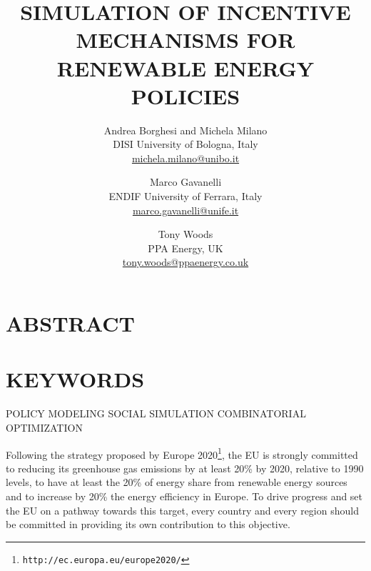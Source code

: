\documentclass [twocolumn,a4paper,10pt]{ECMS}
\newcommand{\Section}[1]{\section*{#1}\vspace*{-0.7em}}
\newcommand{\Subsection}[1]{\subsection*{#1}\vspace*{-0.7em}}
\begin{document}

\title{SIMULATION OF INCENTIVE MECHANISMS FOR RENEWABLE ENERGY POLICIES} %


\author{Andrea Borghesi and Michela Milano  \\
DISI University of Bologna, Italy\\
\url{michela.milano@unibo.it}
\and %
Marco Gavanelli\\
ENDIF University of Ferrara, Italy\\
\url{marco.gavanelli@unife.it}
\and
Tony Woods\\
PPA Energy, UK \\
\url{tony.woods@ppaenergy.co.uk}
}


\date{} %

\maketitle %




\Section{ABSTRACT} %




\Section{KEYWORDS} %
POLICY MODELING
SOCIAL SIMULATION
COMBINATORIAL OPTIMIZATION


Following the strategy proposed by Europe 2020\footnote{{\tt http://ec.europa.eu/europe2020/}}, the EU is strongly committed to reducing its greenhouse gas emissions by at least 20\% by 2020, relative to 1990 levels, to have at least the 20\% of energy share from renewable energy sources and to increase by 20\% the energy efficiency in Europe. To drive progress and set the EU on a pathway towards this target, every country and every region should be committed in providing its own contribution to this objective.
\end{document}

